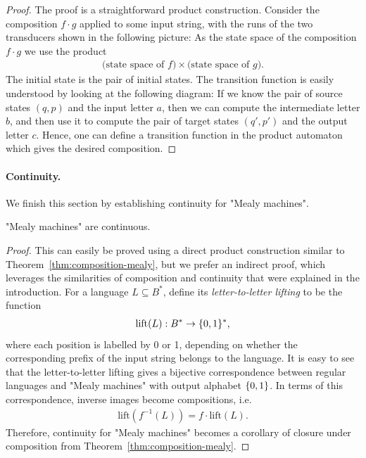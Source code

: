 \begin{proof}
    The proof is a straightforward product construction. Consider the composition $f \cdot g$ applied to some input string, with the runs of the two transducers shown in the following picture:
    As the state space of the composition $f \cdot g$ we use the product 
    \begin{align*}
    \text{(state space of $f$)} \times \text{(state space of $g$)}.
    \end{align*}
    The initial state is the pair of initial states. The transition function is easily understood by looking at the following diagram:
     If we know the  pair of source states $(q,p)$ and the input letter $a$, then we can compute the intermediate letter $b$, and then use it to compute the pair of target states $(q',p')$ and the output letter $c$. Hence, one can define a transition function in the product automaton which gives the desired composition.
\end{proof}


\paragraph*{Continuity.} We finish this section by establishing continuity for "Mealy machines".

\begin{theorem} 
    \label{thm:continuity-mealy}
    "Mealy machines" are continuous.
\end{theorem}

\begin{proof}
    This can easily be proved using a direct  product construction similar to Theorem~\ref{thm:composition-mealy}, but we prefer an indirect proof, which leverages the similarities of composition and continuity that were explained in the introduction.  For a  language $L \subseteq B^*$, define its \emph{letter-to-letter lifting} to be the function  
    \begin{align*}
\text{lift}(L): B^* \to \{0,1\}^*,
    \end{align*}
    where each position is labelled by 0 or 1, depending on whether the corresponding prefix  of the input string belongs to the language. It is easy to see that the letter-to-letter lifting gives a bijective correspondence between regular languages and "Mealy machines" with output alphabet $\{0,1\}$. In terms of this correspondence, inverse images become compositions, i.e.
    \begin{align*}
    \text{lift}(f^{-1}(L)) = f \cdot \text{lift}(L).
    \end{align*}
    Therefore, continuity for "Mealy machines" becomes a corollary of closure under composition from Theorem~\ref{thm:composition-mealy}.
\end{proof}





